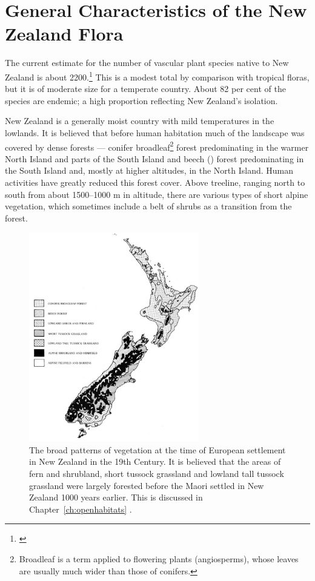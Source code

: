 \chapter{General Characteristics of the New Zealand Flora}

The current estimate for the number of vascular plant species native to New Zealand is about 2200.\footnote{\cite{druce1984indigenous}}
This is a modest total by comparison with tropical floras, but it is of moderate size for a temperate country.
About 82 per cent of the species are endemic; a high proportion reflecting New Zealand's isolation.

New Zealand is a generally moist country with mild temperatures in the lowlands.
It is believed that before human habitation much of the landscape was covered by dense forests --- conifer broadleaf\footnote{Broadleaf is a term applied to flowering plants (angiosperms), whose leaves are usually much wider than those of conifers.} forest predominating in the warmer North Island and parts of the South Island and beech () forest predominating in the South Island and, mostly at higher altitudes, in the North Island.
Human activities have greatly reduced this forest cover.
Above treeline, ranging north to south from about 1500--1000 m in altitude, there are various types of short alpine vegetation, which sometimes include a belt of shrubs as a transition from the forest.

\begin{figure}
	\includegraphics[width=0.66\textwidth]{graphics/figure1vegetation-patterns.jpg}
	\centering
	\caption[Broad patterns of vegetation]{The broad patterns of vegetation at the time of European settlement in New Zealand in the 19th Century. 
	It is believed that the areas of fern and shrubland, short tussock grassland and lowland tall tussock grassland were largely forested before the Maori settled in New Zealand 1000 years earlier. 
	This is discussed in Chapter~\ref{ch:openhabitats} .}%
	\label{fig:1vegetationpatterns}
\end{figure}

